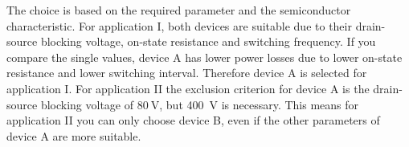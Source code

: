 
\begin{solutionblock}
    The choice is based on the required parameter and the semiconductor characteristic. For application I, both devices are suitable due to their 
    drain-source blocking voltage, on-state resistance and switching frequency. If you compare the single values, device A has lower power losses
    due to lower on-state resistance and lower switching interval. Therefore device A is selected for application I.
    For application II the exclusion criterion for device A is the drain-source blocking voltage of $\SI{80}{\volt}$, but \SI{400}{\volt} is necessary.
    This means for application II you can only choose device B, even if the other parameters of device A are more suitable.
\end{solutionblock}


